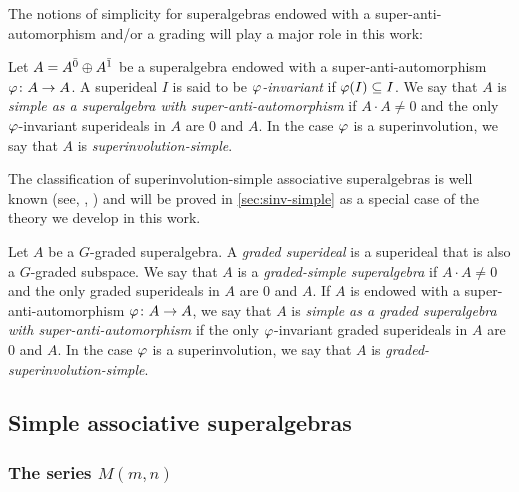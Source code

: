 The notions of simplicity for superalgebras endowed with a super-anti-automorphism and/or a grading will play a major role in this work:

\begin{defi}\label{defi:superinvolution-simple}
    Let $A = A^{\bar0} \oplus A^{\bar1}$ be a superalgebra endowed with a super-anti-automorphism $\varphi\colon A \to A$. 
    A superideal $I$ is said to be \emph{$\varphi$-invariant} if $\varphi(I) \subseteq I$. 
    We say that $A$ is \emph{simple as a superalgebra with super-anti-automorphism} if $A\cdot A \neq 0$ and the only $\varphi$-invariant superideals in $A$ are $0$ and $A$. 
    In the case $\varphi$ is a superinvolution, we say that $A$ is \emph{superinvolution-simple}.
\end{defi}

The classification of superinvolution-simple associative superalgebras is well known (see, \eg, \cite{racine}) and will be proved in \cref{sec:sinv-simple} as a special case of the theory we develop in this work. 

\begin{defi}\label{defi:graded-simple}
    Let $A$ be a $G$-graded superalgebra. 
    A \emph{graded superideal} is a superideal that is also a $G$-graded subspace. 
    We say that $A$ is a  \emph{graded-simple superalgebra} if $A\cdot A \neq 0$ and the only graded superideals in $A$ are $0$ and $A$. 
    If $A$ is endowed with a super-anti-automorphism $\varphi\colon A \to A$, we say that $A$ is \emph{simple as a graded superalgebra with super-anti-automorphism} if the only $\varphi$-invariant graded superideals in $A$ are $0$ and $A$. 
    In the case $\varphi$ is a superinvolution, we say that $A$ is \emph{graded-superinvolution-simple}.
\end{defi}

\subsection{Simple associative superalgebras}\label{subsec:simple-associative}

\subsubsection{The series \texorpdfstring{$M(m,n)$}{M(m,n)}}

